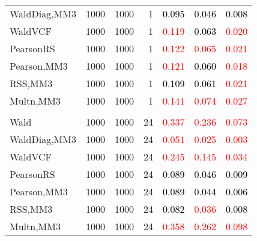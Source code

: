 \documentclass[
]{article}
\begin{document}
\begin{table}[H]
{\begin{tabular}[t]{lrrrrrr}
\hspace{1em}WaldDiag,MM3 & 1000 & 1000 & 1 & \textcolor{black}{0.095} & \textcolor{black}{0.046} & \textcolor{black}{0.008}\\
\hspace{1em}WaldVCF & 1000 & 1000 & 1 & \textcolor{red}{0.119} & \textcolor{black}{0.063} & \textcolor{red}{0.020}\\
\hspace{1em}PearsonRS & 1000 & 1000 & 1 & \textcolor{red}{0.122} & \textcolor{red}{0.065} & \textcolor{red}{0.021}\\
\hspace{1em}Pearson,MM3 & 1000 & 1000 & 1 & \textcolor{red}{0.121} & \textcolor{black}{0.060} & \textcolor{red}{0.018}\\
\hspace{1em}RSS,MM3 & 1000 & 1000 & 1 & \textcolor{black}{0.109} & \textcolor{black}{0.061} & \textcolor{red}{0.021}\\
\hspace{1em}Multn,MM3 & 1000 & 1000 & 1 & \textcolor{red}{0.141} & \textcolor{red}{0.074} & \textcolor{red}{0.027}\\
\addlinespace[0.3em]
\multicolumn{7}{l}{\textbf{1F 15V}}\\
\hspace{1em}Wald & 1000 & 1000 & 24 & \textcolor{red}{0.337} & \textcolor{red}{0.236} & \textcolor{red}{0.073}\\
\hspace{1em}WaldDiag,MM3 & 1000 & 1000 & 24 & \textcolor{red}{0.051} & \textcolor{red}{0.025} & \textcolor{red}{0.003}\\
\hspace{1em}WaldVCF & 1000 & 1000 & 24 & \textcolor{red}{0.245} & \textcolor{red}{0.145} & \textcolor{red}{0.034}\\
\hspace{1em}PearsonRS & 1000 & 1000 & 24 & \textcolor{black}{0.089} & \textcolor{black}{0.046} & \textcolor{black}{0.009}\\
\hspace{1em}Pearson,MM3 & 1000 & 1000 & 24 & \textcolor{black}{0.089} & \textcolor{black}{0.044} & \textcolor{black}{0.006}\\
\hspace{1em}RSS,MM3 & 1000 & 1000 & 24 & \textcolor{black}{0.082} & \textcolor{red}{0.036} & \textcolor{black}{0.008}\\
\hspace{1em}Multn,MM3 & 1000 & 1000 & 24 & \textcolor{red}{0.358} & \textcolor{red}{0.262} & \textcolor{red}{0.098}\\

\end{tabular}}
\end{table}
\end{document}

